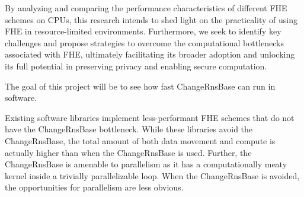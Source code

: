 By analyzing and comparing the performance characteristics of different FHE
schemes on CPUs, this research intends to shed light on the practicality of
using FHE in resource-limited environments. Furthermore, we seek to identify
key challenges and propose strategies to overcome the computational bottlenecks
associated with FHE, ultimately facilitating its broader adoption and unlocking
its full potential in preserving privacy and enabling secure computation.

The goal of this project will be to see how fast ChangeRnsBase can run in
software.

Existing software libraries implement less-performant FHE schemes that do not
have the ChangeRnsBase bottleneck.
While these libraries avoid the
ChangeRnsBase, the total amount of both data movement and compute is actually
higher than when the ChangeRnsBase is used\cite{samardzic:isca22:craterlake}.
Further, the ChangeRnsBase is amenable to parallelism as it has a
computationally meaty kernel inside a trivially parallelizable loop.
When the ChangeRnsBase is avoided, the opportunities for parallelism are less
obvious.


